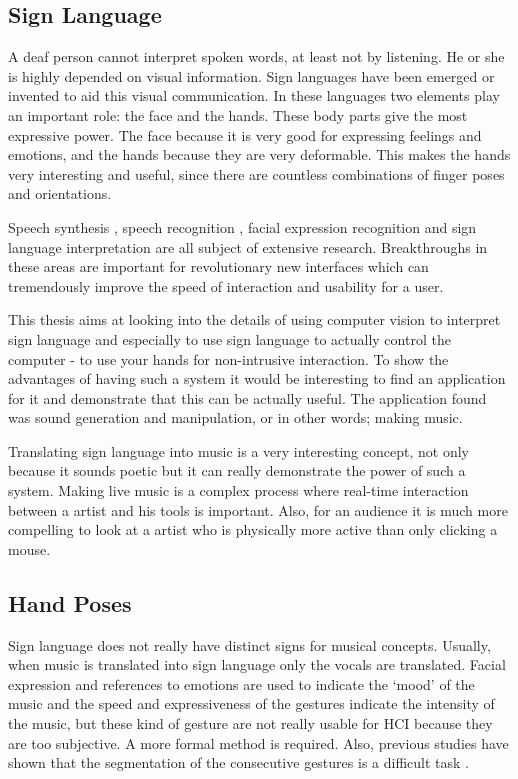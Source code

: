 \subsection*{Sign Language}

A deaf person cannot interpret spoken words, at least not by listening. He or she is highly depended on visual information. Sign languages have been emerged or invented to aid this visual communication. In these languages two elements play an important role: the face and the hands. These body parts give the most expressive power. The face because it is very good for expressing feelings and emotions, and the hands because they are very deformable. This makes the hands very interesting and useful, since there are countless combinations of finger poses and orientations. 

Speech synthesis \citep{Hunt1996}, speech recognition \citep{rabiner1993}, facial expression recognition \citep{Cohen2003} and sign language interpretation \citep{Cooper2007} are all subject of extensive research. Breakthroughs in these areas are important for revolutionary new interfaces which can tremendously improve the speed of interaction and usability for a user. 

This thesis aims at looking into the details of using computer vision to interpret sign language and especially to use sign language to actually control the computer - to use your hands for non-intrusive interaction. To show the advantages of having such a system it would be interesting to find an application for it and demonstrate that this can be actually useful. The application found was sound generation and manipulation, or in other words; making music. 

Translating sign language into music is a very interesting concept, not only because it sounds poetic but it can really demonstrate the power of such a system. Making live music is a complex process where real-time interaction between a artist and his tools is important. Also, for an audience it is much more compelling to look at a artist who is physically more active than only clicking a mouse.

\subsection*{Hand Poses}
Sign language does not really have distinct signs for musical concepts. Usually, when music is translated into sign language only the vocals are translated. Facial expression and references to emotions are used to indicate the `mood' of the music and the speed and expressiveness of the gestures indicate the intensity of the music, but these kind of gesture are not really usable for HCI because they are too subjective. A more formal method is required. Also, previous studies have shown that the segmentation of the consecutive gestures is a difficult task \citep{Buehler2009,RichardBowden2004}.

